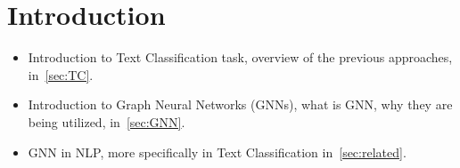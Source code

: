 \section{Introduction}
\begin{itemize}
    \item Introduction to Text Classification task, overview of the previous approaches, in~\cref{sec:TC}.
    \item Introduction to Graph Neural Networks (GNNs), what is GNN, why they are being utilized, in~\cref{sec:GNN}.
    \item GNN in NLP, more specifically in Text Classification in~\cref{sec:related}.
\end{itemize}

\clearpage
